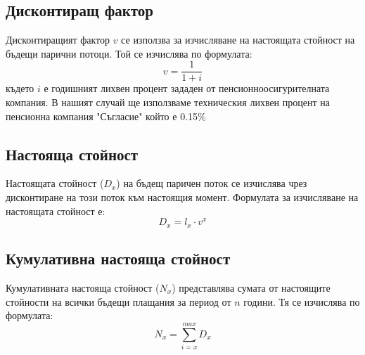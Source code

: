 \documentclass[a4paper,12pt]{article}
\begin{document}
\subsection{Дисконтиращ фактор}
Дисконтиращият фактор $v$ се използва за изчисляване на настоящата стойност на бъдещи парични потоци. Той се изчислява по формулата:
\[v = \frac{1}{1+i}\]
където $i$ е годишният лихвен процент зададен от пенсионноосигурителната компания. В нашият случай ще използваме техническия лихвен процент на пенсионна компания "Съгласие" който е 0.15\% \cite{DKFN_Pensions}
\subsection{Настояща стойност}
Настоящата стойност ($D_x$) на бъдещ паричен поток се изчислява чрез дисконтиране на този поток към настоящия момент. Формулата за изчисляване на настоящата стойност е:
\[D_x = l_x\cdot v^x\]
\subsection{Кумулативна настояща стойност}
Кумулативната настояща стойност ($N_x$) представлява сумата от настоящите стойности на всички бъдещи плащания за период от $n$ години. Тя се изчислява по формулата:
\[N_x = \sum_{i=x}^{max}D_x\]
\end{document}
